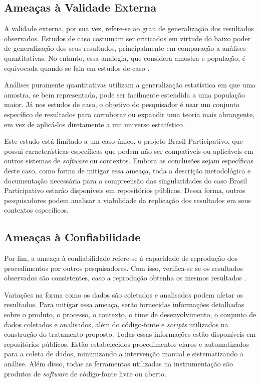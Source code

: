\subsection{Ameaças à Validade Externa}

A validade externa, por sua vez, refere-se ao grau de generalização dos resultados observados. Estudos de caso costumam ser criticados em virtude do baixo poder de generalização dos seus resultados, principalmente em comparação a análises quantitativas. No entanto, essa analogia, que considera amostra e população, é equivocada quando se fala em estudos de caso \cite{yin2015estudo}.

Análises puramente quantitativas utilizam a generalização estatística em que uma amostra, se bem representada, pode ser facilmente estendida a uma população maior. Já nos estudos de caso, o objetivo do pesquisador é usar um conjunto específico de resultados para corroborar ou expandir uma teoria mais abrangente, em vez de aplicá-los diretamente a um universo estatístico \cite{yin2015estudo}.

Este estudo está limitado a um caso único, o projeto Brasil Participativo, que possui características específicas que podem não ser compatíveis ou aplicáveis em outros sistemas de \textit{software} ou contextos. Embora as conclusões sejam específicas deste caso, como forma de mitigar essa ameaça, toda a descrição metodológica e documentação necessária para a compreensão das singularidades do caso Brasil Participativo estarão disponíveis em repositórios públicos. Dessa forma, outros pesquisadores podem analisar a viabilidade da replicação dos resultados em seus contextos específicos.


\subsection{Ameaças à Confiabilidade}

Por fim, a ameaça à confiabilidade refere-se à capacidade de reprodução dos procedimentos por outros pesquisadores. Com isso, verifica-se se os resultados observados são consistentes, caso a reprodução obtenha os mesmos resultados \cite{yin2015estudo} \cite{Wohlin:2012:ESE:2349018}.

Variações na forma como os dados são coletados e analisados podem afetar os resultados. Para mitigar essa ameaça, serão fornecidas informações detalhadas sobre o produto, o processo, o contexto, o time de desenvolvimento, o conjunto de dados coletados e analisados, além do código-fonte e \textit{scripts} utilizados na construção do tratamento proposto. Todas essas informações estão disponíveis em repositórios públicos. Estão estabelecidos procedimentos claros e automatizados para a coleta de dados, minimizando a intervenção manual e sistematizando a análise. Além disso, todas as ferramentas utilizadas na instrumentação são produtos de \textit{software} de código-fonte livre ou aberto.